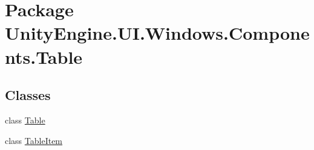 \hypertarget{namespace_unity_engine_1_1_u_i_1_1_windows_1_1_components_1_1_table}{}\section{Package Unity\+Engine.\+U\+I.\+Windows.\+Components.\+Table}
\label{namespace_unity_engine_1_1_u_i_1_1_windows_1_1_components_1_1_table}
\subsection*{Classes}
\begin{DoxyCompactItemize}
\item 
class \hyperlink{class_unity_engine_1_1_u_i_1_1_windows_1_1_components_1_1_table_1_1_table}{Table}
\item 
class \hyperlink{class_unity_engine_1_1_u_i_1_1_windows_1_1_components_1_1_table_1_1_table_item}{Table\+Item}
\end{DoxyCompactItemize}

